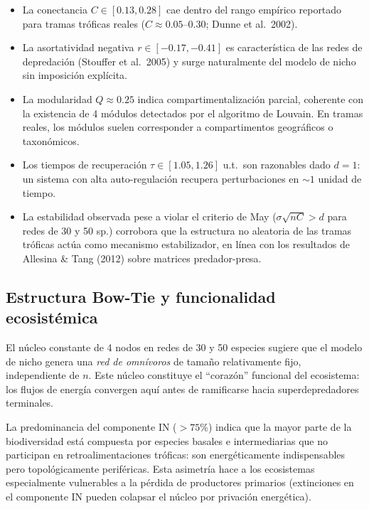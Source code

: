 \documentclass[12pt, a4paper]{article}
\begin{document}
\begin{itemize}
    \item La conectancia $C \in [0.13, 0.28]$ cae dentro del rango empírico reportado
          para tramas tróficas reales ($C \approx 0.05$--$0.30$; Dunne et al.\ 2002).

    \item La asortatividad negativa $r \in [-0.17, -0.41]$ es característica de las
          redes de depredación (Stouffer et al.\ 2005) y surge naturalmente del
          modelo de nicho sin imposición explícita.

    \item La modularidad $Q \approx 0.25$ indica compartimentalización parcial,
          coherente con la existencia de 4 módulos detectados por el algoritmo de
          Louvain. En tramas reales, los módulos suelen corresponder a
          compartimentos geográficos o taxonómicos.

    \item Los tiempos de recuperación $\tau \in [1.05, 1.26]$ u.t.\ son razonables
          dado $d = 1$: un sistema con alta auto-regulación recupera perturbaciones
          en $\sim 1$ unidad de tiempo.

    \item La estabilidad observada pese a violar el criterio de May ($\sigma\sqrt{nC} > d$
          para redes de 30 y 50 sp.) corrobora que la estructura no aleatoria de las
          tramas tróficas actúa como mecanismo estabilizador, en línea con los
          resultados de Allesina \& Tang (2012) sobre matrices predador-presa.
\end{itemize}

\subsection{Estructura Bow-Tie y funcionalidad ecosistémica}

El núcleo constante de 4 nodos en redes de 30 y 50 especies sugiere que el modelo
de nicho genera una \textit{red de omnívoros} de tamaño relativamente fijo,
independiente de $n$. Este núcleo constituye el ``corazón'' funcional del ecosistema:
los flujos de energía convergen aquí antes de ramificarse hacia superdepredadores
terminales.

La predominancia del componente IN ($>75$\%) indica que la mayor parte de la
biodiversidad está compuesta por especies basales e intermediarias que no participan
en retroalimentaciones tróficas: son energéticamente indispensables pero
topológicamente periféricas. Esta asimetría hace a los ecosistemas especialmente
vulnerables a la pérdida de productores primarios (extinciones en el componente IN
pueden colapsar el núcleo por privación energética).
\end{document}
